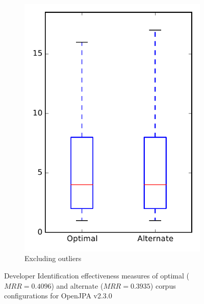 \begin{figure}
\begin{subfigure}{.4\textwidth}
        \includegraphics[height=0.4\textheight]{figures/combo/dit_rq2_openjpa_no_outlier}
        \caption{Excluding outliers}\label{fig:combo:dit:rq2:openjpa_no_outlier}
    \end{subfigure}
\caption[Developer Identification effectiveness measures of optimal and alternate corpus configurations for OpenJPA v2.3.0]%
{Developer Identification effectiveness measures of optimal ($MRR=0.4096$) and alternate ($MRR=0.3935$) corpus configurations for OpenJPA v2.3.0}
\label{fig:combo:dit:rq2:openjpa}
\end{figure}
